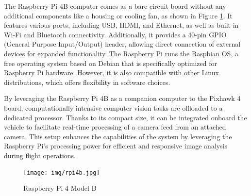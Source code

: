 The Raspberry Pi 4B computer comes as a bare circuit board without any additional components like a housing or cooling fan, as shown in Figure \ref{fig:rpi4b}. It features various ports, including USB, HDMI, and Ethernet, as well as built-in Wi-Fi and Bluetooth connectivity. Additionally, it provides a 40-pin GPIO (General Purpose Input/Output) header, allowing direct connection of external devices for expanded functionality.
The Raspberry Pi runs the Raspbian OS, a free operating system based on Debian that is specifically optimized for Raspberry Pi hardware. However, it is also compatible with other Linux distributions, which offers flexibility in software choices.

By leveraging the Raspberry Pi 4B as a companion computer to the Pixhawk 4 board, computationally intensive computer vision tasks are offloaded to a dedicated processor. Thanks to its compact size, it can be integrated onboard the vehicle to facilitate real-time processing of a camera feed from an attached camera. This setup enhances the capabilities of the system by leveraging the Raspberry Pi's processing power for efficient and responsive image analysis during flight operations.

\begin{figure}[H]
  \centering
  \texttt{[image: img/rpi4b.jpg]}
  \caption{Raspberry Pi 4 Model B}
  \label{fig:rpi4b}
\end{figure}
